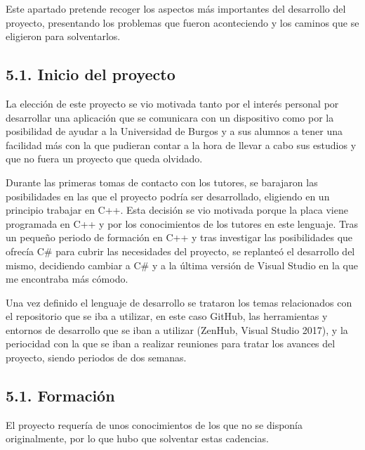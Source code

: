 
Este apartado pretende recoger los aspectos más importantes del desarrollo del proyecto, presentando los problemas que fueron aconteciendo y los caminos que se eligieron para solventarlos.

\subsection{5.1. Inicio del proyecto}

La elección de este proyecto se vio motivada tanto por el interés personal por desarrollar una aplicación que se comunicara con un dispositivo como por la posibilidad de ayudar a la Universidad de Burgos y a sus alumnos a tener una facilidad más con la que pudieran contar a la hora de llevar a cabo sus estudios y que no fuera un proyecto que queda olvidado.

Durante las primeras tomas de contacto con los tutores, se barajaron las posibilidades en las que el proyecto podría ser desarrollado, eligiendo en un principio trabajar en C++. Esta decisión se vio motivada porque la placa viene programada en C++ y por los conocimientos de los tutores en este lenguaje. Tras un pequeño periodo de formación en C++ y tras investigar las posibilidades que ofrecía C\# para cubrir las necesidades del proyecto, se replanteó el desarrollo del mismo, decidiendo cambiar a C\# y a la última versión de Visual Studio en la que me encontraba más cómodo.

Una vez definido el lenguaje de desarrollo se trataron los temas relacionados con el repositorio que se iba a utilizar, en este caso GitHub, las herramientas y entornos de desarrollo que se iban a utilizar (ZenHub, Visual Studio 2017), y la periocidad con la que se iban a realizar reuniones para tratar los avances del proyecto, siendo periodos de dos semanas.

\subsection{5.1. Formación}

El proyecto requería de unos conocimientos de los que no se disponía originalmente, por lo que hubo que solventar estas cadencias.